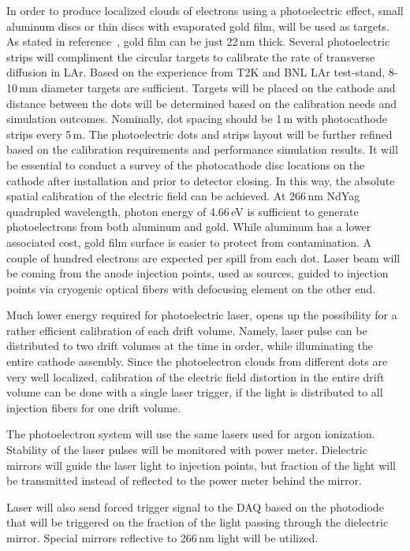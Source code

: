 In order to produce localized clouds of electrons using a photoelectric effect, small aluminum discs or thin discs with evaporated gold film, will be used as targets. As stated in reference~\cite{BNL_teststand}, gold film can be just 22\,nm thick. Several photoelectric strips will compliment the circular targets to calibrate the rate of transverse diffusion in LAr. Based on the experience from T2K and BNL LAr test-stand\cite{BNL_teststand}, 8-10\,mm diameter targets are sufficient. Targets will be placed on the cathode and distance between the dots will be determined based on the calibration needs and simulation outcomes. Nominally, dot spacing should be 1\,m with photocathode strips every 5\,m. The photoelectric dots and strips layout will be further refined based on the calibration requirements and performance simulation results. It will be essential to conduct a survey of the photocathode disc locations on the cathode  after installation and prior to detector closing. In this way, the absolute spatial calibration of the electric field can be achieved. At 266\,nm NdYag quadrupled wavelength, photon energy of 4.66\,eV is sufficient to generate photoelectrons from both aluminum and gold. While aluminum has a lower associated cost, gold film surface is easier to protect from contamination. A couple of hundred electrons are expected per spill from each dot. Laser beam will be coming from the anode injection points, used as sources, guided to injection points via cryogenic optical fibers with defocusing element on the other end. 

Much lower energy required for photoelectric laser, opens up the possibility for a rather efficient calibration of each drift volume. Namely, laser pulse can be distributed to two drift volumes at the time in order, while illuminating the entire cathode assembly. Since the photoelectron clouds from different dots are very well localized, calibration of the electric field distortion in the entire drift volume can be done with a single laser trigger, if the light is distributed to all injection fibers for one drift volume. 

The photoelectron system will use the same lasers used for argon ionization. Stability of the laser pulses will be monitored  with  power meter. Dielectric mirrors will guide the laser light to injection points, but fraction of the light will be transmitted instead of reflected to the power meter behind the mirror. 

Laser will also send forced trigger signal to the DAQ based on the photodiode that will be triggered on the fraction of the light passing through the dielectric mirror. Special mirrors reflective to 266\,nm light will be utilized. 

